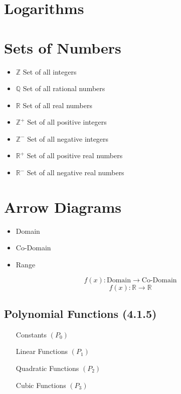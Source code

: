 \documentclass[a4paper,12pt]{article}
\begin{document}
\section*{Logarithms}


\section{Sets of Numbers}

\begin{itemize}
\item $\mathbb{Z}$ Set of all integers
\item $\mathbb{Q}$ Set of all rational numbers
\item $\mathbb{R}$ Set of all real numbers
\end{itemize}


\begin{itemize}
\item $\mathbb{Z}^{+}$ Set of all positive integers
\item $\mathbb{Z}^{-}$ Set of all negative integers
\item $\mathbb{R}^{+}$ Set of all positive real numbers
\item $\mathbb{R}^{-}$ Set of all negative real numbers
\end{itemize}

\section{Arrow Diagrams}

\begin{itemize}

\item Domain
\item Co-Domain
\item Range
\end{itemize}
\[  f(x) : \mbox{Domain} \rightarrow \mbox{Co-Domain} \]
\[  f(x) : \mathbb{R} \rightarrow \mathbb{R} \]
\newpage
\subsection*{Polynomial Functions (4.1.5)}

\begin{itemize}
\item[Constants] $(P_0)$
\item[Linear Functions] $(P_1)$
\item[Quadratic Functions] $(P_2)$
\item[Cubic Functions] $(P_3)$
\end{itemize}
\end{document}
